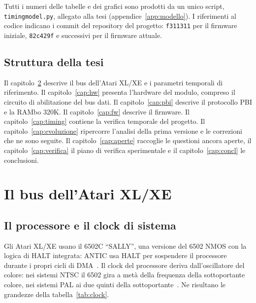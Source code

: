 \documentclass[11pt,a4paper,twoside,openright]{report}
\DeclareRobustCommand{\code}[1]{\begingroup\renewcommand{\_}{\textunderscore\allowbreak}\texttt{#1}\endgroup}
\newcommand{\sig}[1]{\textsf{#1}}
\begin{document}
Tutti i numeri delle tabelle e dei grafici sono prodotti da un unico script,
\code{timing\_model.py}, allegato alla tesi (appendice~\ref{app:modello}). I riferimenti al
codice indicano i commit del repository del progetto: \code{f311311} per il firmware
iniziale, \code{82c429f} e successivi per il firmware attuale.

\section{Struttura della tesi}

Il capitolo~\ref{cap:bus} descrive il bus dell'Atari XL/XE e i parametri temporali di
riferimento. Il capitolo~\ref{cap:hw} presenta l'hardware del modulo, compreso il circuito
di abilitazione del bus dati. Il capitolo~\ref{cap:pbi} descrive il protocollo PBI e la
RAMbo 320K. Il capitolo~\ref{cap:fw} descrive il firmware. Il capitolo~\ref{cap:timing}
contiene la verifica temporale del progetto. Il capitolo~\ref{cap:evoluzione} ripercorre
l'analisi della prima versione e le correzioni che ne sono seguite. Il
capitolo~\ref{cap:aperte} raccoglie le questioni ancora aperte, il
capitolo~\ref{cap:verifica} il piano di verifica sperimentale e il
capitolo~\ref{cap:concl} le conclusioni.

\chapter{Il bus dell'Atari XL/XE}
\label{cap:bus}

\section{Il processore e il clock di sistema}

Gli Atari XL/XE usano il 6502C \enquote{SALLY}, una versione del 6502 NMOS con la logica
di \sig{HALT} integrata: ANTIC usa \sig{HALT} per sospendere il processore durante i propri
cicli di DMA~\cite{ahrm}. Il clock del processore deriva dall'oscillatore del colore:
nei sistemi NTSC il 6502 gira a metà della frequenza della sottoportante colore, nei
sistemi PAL ai due quinti della sottoportante~\cite[§2.2]{ahrm}. Ne risultano le
grandezze della tabella~\ref{tab:clock}.
\end{document}

